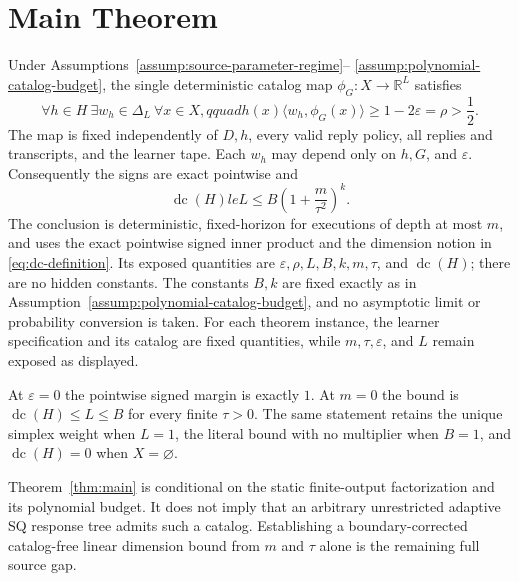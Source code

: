\section{Main Theorem}\label{sec:main-theorem}

\begin{theorem}\label{thm:main}
Under Assumptions~\ref{assump:source-parameter-regime}--
\ref{assump:polynomial-catalog-budget}, the single deterministic catalog map
$\phi_G:X\to\mathbb R^L$ satisfies
\[
\forall h\in H\ \exists w_h\in\Delta_L\ \forall x\in X,qquad
h(x)\langle w_h,\phi_G(x)\rangle
\ge 1-2\varepsilon=\rho>\frac12.
\]
The map is fixed independently of $D,h$, every valid reply policy, all replies
and transcripts, and the learner tape.  Each $w_h$ may depend only on
$h,G$, and $\varepsilon$.  Consequently the signs are exact pointwise and
\[
\operatorname{dc}(H)le L
\le B\left(1+\frac{m}{\tau^2}\right)^k.
\]
The conclusion is deterministic, fixed-horizon for executions of depth at
most $m$, and uses the exact pointwise signed inner product and the dimension
notion in \eqref{eq:dc-definition}.  Its exposed quantities are
$\varepsilon,\rho,L,B,k,m,\tau$, and $\operatorname{dc}(H)$; there are no
hidden constants.  The constants $B,k$ are fixed exactly as in
Assumption~\ref{assump:polynomial-catalog-budget}, and no asymptotic limit or
probability conversion is taken.  For each theorem instance, the learner
specification and its catalog are fixed quantities, while
$m,\tau,\varepsilon$, and $L$ remain exposed as displayed.

At $\varepsilon=0$ the pointwise signed margin is exactly $1$.  At $m=0$
the bound is $\operatorname{dc}(H)\le L\le B$ for every finite $\tau>0$.
The same statement retains the unique simplex weight when $L=1$, the literal
bound with no multiplier when $B=1$, and $\operatorname{dc}(H)=0$ when
$X=\varnothing$.
\end{theorem}

Theorem~\ref{thm:main} is conditional on the static finite-output
factorization and its polynomial budget.  It does not imply that an arbitrary
unrestricted adaptive SQ response tree admits such a catalog.  Establishing a
boundary-corrected catalog-free linear dimension bound from $m$ and $\tau$
alone is the remaining full source gap.
